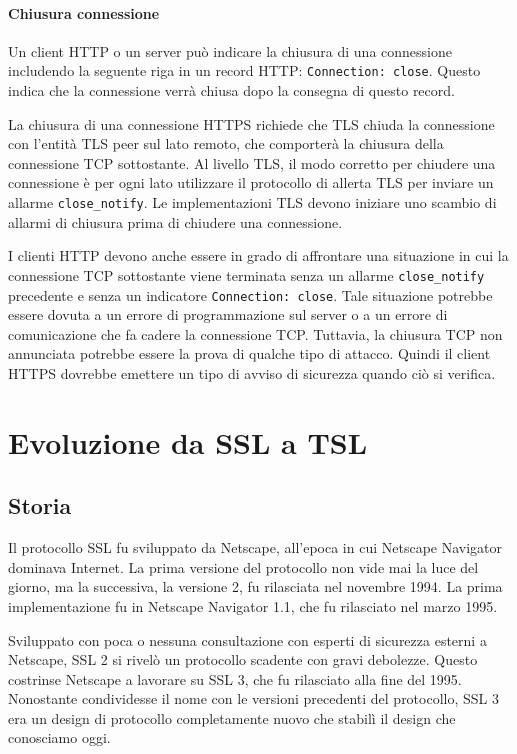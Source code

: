 \documentclass{article}
\theoremstyle{definition}
\begin{document}
\paragraph{Chiusura connessione}
Un client HTTP o un server può indicare la chiusura di una connessione includendo la seguente riga in un record HTTP: \texttt{Connection: close}. Questo indica che la connessione verrà chiusa dopo la consegna di questo record.

La chiusura di una connessione HTTPS richiede che TLS chiuda la connessione con l'entità TLS peer sul lato remoto, che comporterà la chiusura della connessione TCP sottostante. Al livello TLS, il modo corretto per chiudere una connessione è per ogni lato utilizzare il protocollo di allerta TLS per inviare un allarme \texttt{close\_notify}. Le implementazioni TLS devono iniziare uno scambio di allarmi di chiusura prima di chiudere una connessione.

I clienti HTTP devono anche essere in grado di affrontare una situazione in cui la connessione TCP sottostante viene terminata senza un allarme \texttt{close\_notify} precedente e senza un indicatore \texttt{Connection: close}. Tale situazione potrebbe essere dovuta a un errore di programmazione sul server o a un errore di comunicazione che fa cadere la connessione TCP. Tuttavia, la chiusura TCP non annunciata potrebbe essere la prova di qualche tipo di attacco. Quindi il client HTTPS dovrebbe emettere un tipo di avviso di sicurezza quando ciò si verifica.


\section{Evoluzione da SSL a TSL}

\subsection{Storia}
Il protocollo SSL fu sviluppato da Netscape, all'epoca in cui Netscape Navigator dominava Internet. La prima versione del protocollo non vide mai la luce del giorno, ma la successiva, la versione 2, fu rilasciata nel novembre 1994. La prima implementazione fu in Netscape Navigator 1.1, che fu rilasciato nel marzo 1995.

Sviluppato con poca o nessuna consultazione con esperti di sicurezza esterni a Netscape, SSL 2 si rivelò un protocollo scadente con gravi debolezze. Questo costrinse Netscape a lavorare su SSL 3, che fu rilasciato alla fine del 1995. Nonostante condividesse il nome con le versioni precedenti del protocollo, SSL 3 era un design di protocollo completamente nuovo che stabilì il design che conosciamo oggi.
\end{document}
